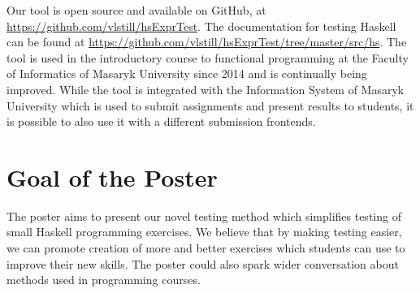\documentclass[sigconf,screen]{acmart} %
\begin{document}
Our tool is open source and available on GitHub, at
\url{https://github.com/vlstill/hsExprTest}.
The documentation for testing Haskell can be found at
\url{https://github.com/vlstill/hsExprTest/tree/master/src/hs}.
The tool is used in the introductory course to functional programming at the
Faculty of Informatics of Masaryk University since 2014 and is continually
being improved.
While the tool is integrated with the Information System of Masaryk University
which is used to submit assignments and present results to students, it is
possible to also use it with a different submission frontends.

\section{Goal of the Poster}

The poster aims to present our novel testing method which simplifies testing of
small Haskell programming exercises.
We believe that by making testing easier, we can promote creation of more and
better exercises which students can use to improve their new skills.
The poster could also spark wider conversation about methods used in
programming courses.

\balance


\end{document}

